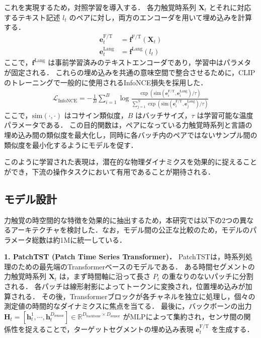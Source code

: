 \documentclass[Japanese]{dicomopapers}
\begin{document}
これを実現するため，対照学習を導入する．
各力触覚時系列 $\mathbf{X}_t$ とそれに対応するテキスト記述 $l_t$ のペアに対し，両方のエンコーダを用いて埋め込みを計算する．
\begin{align}
\mathbf{e}^{\text{F/T}}_t &= \mathbf{f}^{\text{F/T}}(\mathbf{X}_t) \\
\mathbf{e}^{\text{Lang}}_t &= \mathbf{f}^{\text{Lang}}(l_t)
\end{align}
ここで，$\mathbf{f}^{\text{Lang}}$ は事前学習済みのテキストエンコーダであり，学習中はパラメタが固定される．
これらの埋め込みを共通の意味空間で整合させるために，CLIPのトレーニングで一般的に使用されるInfoNCE損失\cite{InfoNCEloss}を採用した．
\begin{align}
    \mathcal{L}_{\text{InfoNCE}} = -\frac{1}{B}\sum_{i=1}^{B} \log \frac{\exp(\text{sim}(\mathbf{e}^{\text{F/T}}_i, \mathbf{e}^{\text{Lang}}_i) / \tau)}{\sum_{j=1}^{N} \exp(\text{sim}(\mathbf{e}^{\text{F/T}}_i, \mathbf{e}^{\text{Lang}}_j) / \tau)}
\end{align}
ここで，$\text{sim}(\cdot, \cdot)$ はコサイン類似度，$B$ はバッチサイズ，$\tau$ は学習可能な温度パラメータである．
この目的関数は，ペアになっている力触覚時系列と言語の埋め込み間の類似度を最大化し，同時に各バッチ内のペアではないサンプル間の類似度を最小化するようにモデルを促す．

このように学習された表現は，潜在的な物理ダイナミクスを効果的に捉えることができ，下流の操作タスクにおいて有用であることが期待される．

\subsection{モデル設計}
力触覚の時空間的な特徴を効果的に抽出するため，本研究では以下の2つの異なるアーキテクチャを検討した．なお，モデル間の公正な比較のため，モデルのパラメータ総数は約1Mに統一している．

\textbf{1. PatchTST (Patch Time Series Transformer)．}
PatchTST\cite{PatchTST}は，時系列処理のための最先端のTransformerベースのモデルである．
ある時間セグメントの力触覚時系列 $\mathbf{X}_t$ は，まず時間軸に沿って長さ $P_t$ の重なりのないパッチに分割される．
各パッチは線形射影によってトークンに変換され，位置埋め込みが加算される．
その後，Transformerブロックが各チャネルを独立に処理し，個々の測定値の時間的なダイナミクスに焦点を当てる．
最後に，バックボーンの出力 $\mathbf{H}_t = [\mathbf{h}_t^1, \cdots, \mathbf{h}_t^{D_\text{sensor}}] \in \mathbb{R}^{D_\text{backbone} \times D_\text{sensor} }$ がMLPによって集約され，センサ間の関係性を捉えることで，ターゲットセグメントの埋め込み表現 $\mathbf{e}^\text{F/T}_t$ を生成する．
\end{document}

